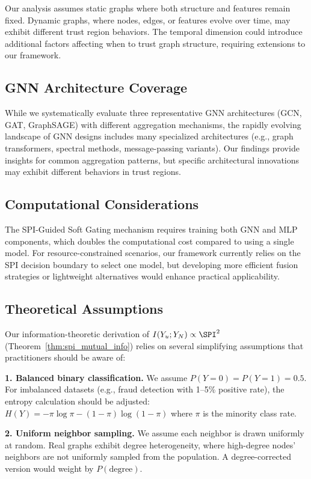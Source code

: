 Our analysis assumes static graphs where both structure and features remain fixed. Dynamic graphs, where nodes, edges, or features evolve over time, may exhibit different trust region behaviors. The temporal dimension could introduce additional factors affecting when to trust graph structure, requiring extensions to our framework.

\subsection{GNN Architecture Coverage}

While we systematically evaluate three representative GNN architectures (GCN, GAT, GraphSAGE) with different aggregation mechanisms, the rapidly evolving landscape of GNN designs includes many specialized architectures (e.g., graph transformers, spectral methods, message-passing variants). Our findings provide insights for common aggregation patterns, but specific architectural innovations may exhibit different behaviors in trust regions.

\subsection{Computational Considerations}

The SPI-Guided Soft Gating mechanism requires training both GNN and MLP components, which doubles the computational cost compared to using a single model. For resource-constrained scenarios, our framework currently relies on the SPI decision boundary to select one model, but developing more efficient fusion strategies or lightweight alternatives would enhance practical applicability.

\subsection{Theoretical Assumptions}

Our information-theoretic derivation of $I(Y_u; Y_N) \propto \SPI^2$ (Theorem~\ref{thm:spi_mutual_info}) relies on several simplifying assumptions that practitioners should be aware of:

\textbf{1. Balanced binary classification.} We assume $P(Y=0) = P(Y=1) = 0.5$. For imbalanced datasets (e.g., fraud detection with 1--5\% positive rate), the entropy calculation should be adjusted: $H(Y) = -\pi \log \pi - (1-\pi) \log(1-\pi)$ where $\pi$ is the minority class rate.

\textbf{2. Uniform neighbor sampling.} We assume each neighbor is drawn uniformly at random. Real graphs exhibit degree heterogeneity, where high-degree nodes' neighbors are not uniformly sampled from the population. A degree-corrected version would weight by $P(\text{degree})$.

